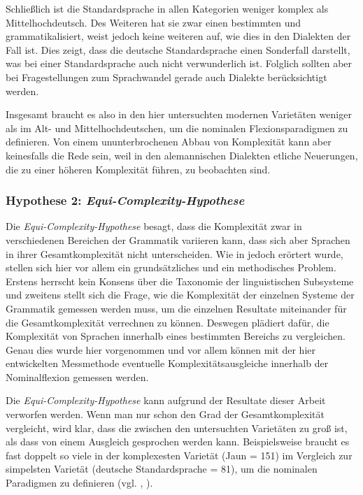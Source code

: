 Schließlich ist die Standardsprache in allen Kategorien weniger komplex als Mittelhochdeutsch. Des Weiteren hat sie zwar einen bestimmten und  grammatikalisiert, weist jedoch keine weiteren  auf, wie dies in den Dialekten der Fall ist. Dies zeigt, dass die deutsche Standardsprache einen Sonderfall darstellt, was bei einer Standardsprache auch nicht verwunderlich ist. Folglich sollten aber bei Fragestellungen zum Sprachwandel gerade auch Dialekte berücksichtigt werden.

Insgesamt braucht es also in den hier untersuchten modernen Varietäten weniger   als im Alt- und Mittelhochdeutschen, um die nominalen Flexionsparadigmen zu definieren. Von einem ununterbrochenen Abbau von Komplexität kann aber keinesfalls die Rede sein, weil in den alemannischen Dialekten etliche Neuerungen, die zu einer höheren Komplexität führen, zu beobachten sind.

\subsubsection{Hypothese 2: \textit{Equi-Complexity-Hypothese}}

Die \textit{Equi-Com\-ple\-xi\-ty-Hy\-po\-the\-se} besagt, dass die Komplexität zwar in verschiedenen Bereichen der Grammatik variieren kann, dass sich aber Sprachen in ihrer Gesamtkomplexität nicht unterscheiden. Wie in  jedoch erörtert wurde, stellen sich hier vor allem ein grundsätzliches und ein methodisches Problem. Erstens herrscht kein Konsens über die Taxonomie der linguistischen Subsysteme und zweitens stellt sich die Frage, wie die Komplexität der einzelnen Systeme der Grammatik gemessen werden muss, um die einzelnen Resultate miteinander für die Gesamtkomplexität verrechnen zu können. Deswegen plädiert \citet{Miestamo2008} dafür, die Komplexität von Sprachen innerhalb eines bestimmten Bereichs zu vergleichen. Genau dies wurde hier vorgenommen und vor allem können mit der hier entwickelten Messmethode eventuelle Komplexitätsausgleiche innerhalb der Nominalflexion gemessen werden.

Die \textit{Equi-Com\-ple\-xi\-ty-Hy\-po\-the\-se} kann aufgrund der Resultate dieser Arbeit verworfen werden. Wenn man nur schon den Grad der Gesamtkomplexität vergleicht, wird klar, dass die  zwischen den untersuchten Varietäten zu groß ist, als dass von einem Ausgleich gesprochen werden kann. Beispielsweise braucht es fast doppelt so viele  in der komplexesten Varietät (Jaun = 151) im Vergleich zur simpelsten Varietät (deutsche Standardsprache = 81), um die nominalen Paradigmen zu definieren (vgl. , ).

